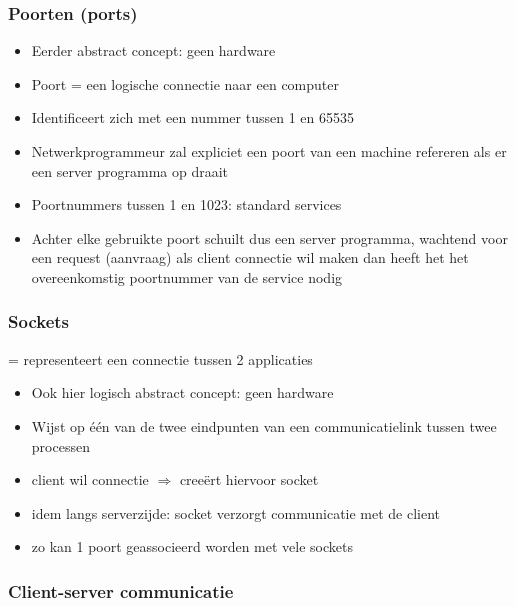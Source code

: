 \documentclass{article}
\begin{document}
\subsubsection{Poorten (ports)}

\begin{itemize}
    \item Eerder abstract concept: geen hardware
    \item Poort = een logische connectie naar een computer
    \item Identificeert zich met een nummer tussen 1 en 65535
    \item Netwerkprogrammeur zal expliciet een poort van een machine refereren als er een server programma op draait
    \item Poortnummers tussen 1 en 1023: standard services
    \item Achter elke gebruikte poort schuilt dus een server programma, wachtend voor een request (aanvraag) als client connectie wil maken dan heeft het het overeenkomstig poortnummer van de service nodig
\end{itemize}

\subsubsection{Sockets}

= representeert een connectie tussen 2 applicaties

\begin{itemize}
    \item Ook hier logisch abstract concept: geen hardware
    \item Wijst op één van de twee eindpunten van een communicatielink tussen twee processen
    \item client wil connectie $\Rightarrow$ creeërt hiervoor socket
    \item idem langs serverzijde: socket verzorgt communicatie met de client
    \item zo kan 1 poort geassocieerd worden met vele sockets
\end{itemize}

\subsubsection{Client-server communicatie}
\end{document}

